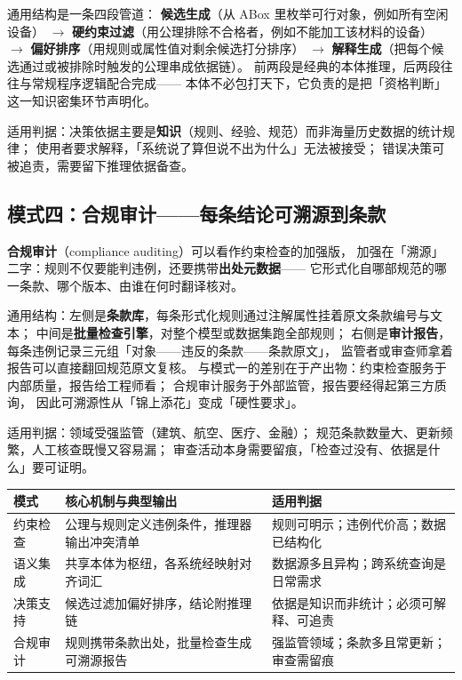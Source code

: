 通用结构是一条四段管道：
\textbf{候选生成}（从 ABox 里枚举可行对象，例如所有空闲设备）
\(\rightarrow\) \textbf{硬约束过滤}（用公理排除不合格者，例如不能加工该材料的设备）
\(\rightarrow\) \textbf{偏好排序}（用规则或属性值对剩余候选打分排序）
\(\rightarrow\) \textbf{解释生成}（把每个候选通过或被排除时触发的公理串成依据链）。
前两段是经典的本体推理，后两段往往与常规程序逻辑配合完成——
本体不必包打天下，它负责的是把「资格判断」这一知识密集环节声明化。

适用判据：决策依据主要是\textbf{知识}（规则、经验、规范）而非海量历史数据的统计规律；
使用者要求解释，「系统说了算但说不出为什么」无法被接受；
错误决策可被追责，需要留下推理依据备查。

\subsection{模式四：合规审计——每条结论可溯源到条款}

\textbf{合规审计}（compliance auditing）可以看作约束检查的加强版，
加强在「溯源」二字：规则不仅要能判违例，还要携带\textbf{出处元数据}——
它形式化自哪部规范的哪一条款、哪个版本、由谁在何时翻译核对。

通用结构：左侧是\textbf{条款库}，每条形式化规则通过注解属性挂着原文条款编号与文本；
中间是\textbf{批量检查引擎}，对整个模型或数据集跑全部规则；
右侧是\textbf{审计报告}，每条违例记录三元组「对象——违反的条款——条款原文」，
监管者或审查师拿着报告可以直接翻回规范原文复核。
与模式一的差别在于产出物：约束检查服务于内部质量，报告给工程师看；
合规审计服务于外部监管，报告要经得起第三方质询，
因此可溯源性从「锦上添花」变成「硬性要求」。

适用判据：领域受强监管（建筑、航空、医疗、金融）；
规范条款数量大、更新频繁，人工核查既慢又容易漏；
审查活动本身需要留痕，「检查过没有、依据是什么」要可证明。

\begin{center}
\begin{tabularx}{\linewidth}{@{}lXX@{}}
\toprule
\textbf{模式} & \textbf{核心机制与典型输出} & \textbf{适用判据} \\
\midrule
约束检查 & 公理与规则定义违例条件，推理器输出冲突清单 & 规则可明示；违例代价高；数据已结构化 \\
语义集成 & 共享本体为枢纽，各系统经映射对齐词汇 & 数据源多且异构；跨系统查询是日常需求 \\
决策支持 & 候选过滤加偏好排序，结论附推理链 & 依据是知识而非统计；必须可解释、可追责 \\
合规审计 & 规则携带条款出处，批量检查生成可溯源报告 & 强监管领域；条款多且常更新；审查需留痕 \\
\bottomrule
\end{tabularx}
\end{center}

